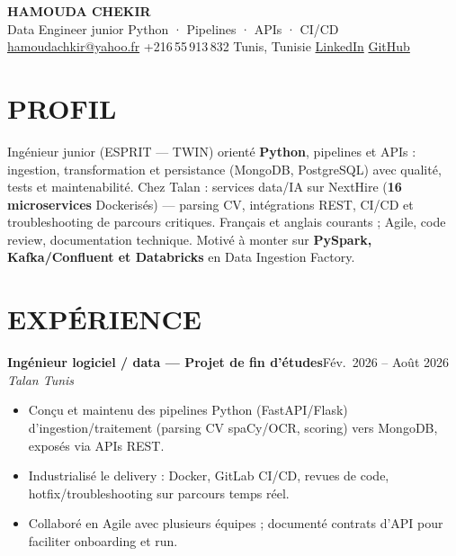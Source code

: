 \documentclass[10pt,a4paper]{article}
\newcommand{\TargetTitle}{Data Engineer junior \textbar{} Python · Pipelines · APIs · CI/CD}
\newcommand{\job}[3]{%
  \textbf{\color{primary}#1}\hfill{\color{muted}\small #2}\\[-1pt]
  {\color{accent}\textit{#3}}\\[1pt]
  \begin{itemize}
}
\newcommand{\contactsep}{\hspace{4pt}{\color{rulecolor}|}\hspace{4pt}}
\begin{document}
{\fontsize{20}{24}\selectfont\bfseries\color{primary}HAMOUDA CHEKIR}\\[1pt]
{\normalsize\color{accent}\TargetTitle}\\[3pt]
{\footnotesize\color{muted}%
  \hspace{2pt}\href{mailto:hamoudachkir@yahoo.fr}{hamoudachkir@yahoo.fr}%
  \contactsep
  \hspace{2pt}+216\,55\,913\,832%
  \contactsep
  \hspace{2pt}Tunis, Tunisie%
  \contactsep
  \hspace{2pt}\href{https://www.linkedin.com/in/hamouda-chekir-5053572b4}{LinkedIn}%
  \contactsep
  \hspace{2pt}\href{https://github.com/hamoudachekir}{GitHub}%
}\\[4pt]

\section{PROFIL}
Ingénieur junior (ESPRIT — TWIN) orienté \textbf{Python}, pipelines et APIs : ingestion, transformation et persistance (MongoDB, PostgreSQL) avec qualité, tests et maintenabilité.
Chez Talan : services data/IA sur NextHire (\textbf{16 microservices} Dockerisés) — parsing CV, intégrations REST, CI/CD et troubleshooting de parcours critiques.
Français et anglais courants ; Agile, code review, documentation technique. Motivé à monter sur \textbf{PySpark, Kafka/Confluent et Databricks} en Data Ingestion Factory.

\section{EXPÉRIENCE}

\job{Ingénieur logiciel / data — Projet de fin d'études}{Fév.\ 2026 -- Août 2026}{Talan \textbar{} Tunis}
  \item Conçu et maintenu des pipelines Python (FastAPI/Flask) d'ingestion/traitement (parsing CV spaCy/OCR, scoring) vers MongoDB, exposés via APIs REST.
  \item Industrialisé le delivery : Docker, GitLab CI/CD, revues de code, hotfix/troubleshooting sur parcours temps réel.
  \item Collaboré en Agile avec plusieurs équipes ; documenté contrats d'API pour faciliter onboarding et run.
\end{itemize}
\end{document}
